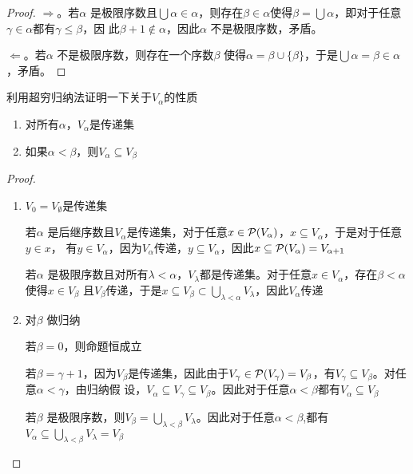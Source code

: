 \documentclass[11pt]{article}
\begin{document}
\begin{proof}
\(\Rightarrow\)。若\(\alpha\) 是极限序数且\(\bigcup\alpha\in\alpha\)，则存在\(\beta\in\alpha\)使得\(\beta=\bigcup\alpha\)，即对于任意\(\gamma\in\alpha\)都有\(\gamma\le\beta\)，因
此\(\beta+1\notin\alpha\)，因此\(\alpha\) 不是极限序数，矛盾。

\(\Leftarrow\)。若\(\alpha\) 不是极限序数，则存在一个序数\(\beta\) 使得\(\alpha=\beta\cup\{\beta\}\)，于是\(\bigcup\alpha=\beta\in\alpha\)，矛盾。
\end{proof}

\begin{exercise}[1.3.43]
利用超穷归纳法证明一下关于\(V_\alpha\)的性质
\begin{enumerate}
\item 对所有\(\alpha\)，\(V_\alpha\)是传递集
\item 如果\(\alpha<\beta\)，则\(V_\alpha\subseteq V_\beta\)
\end{enumerate}
\end{exercise}

\begin{proof}
\begin{enumerate}
\item \(V_0=V_\emptyset\)是传递集

若\(\alpha\) 是后继序数且\(V_\alpha\)是传递集，对于任意\(x\in\mathcal{P}(V_\alpha)\)，\(x\subseteq V_\alpha\)，于是对于任意\(y\in x\)，
有\(y\in V_\alpha\)，因为\(V_\alpha\)传递，\(y\subseteq V_\alpha\)，因此\(x\subseteq\mathcal{P}(V_\alpha)=V_{\alpha+1}\)

若\(\alpha\) 是极限序数且对所有\(\lambda<\alpha\)，\(V_\lambda\)都是传递集。对于任意\(x\in V_\alpha\)，存在\(\beta<\alpha\)使得\(x\in V_\beta\)
且\(V_\beta\)传递，于是\(x\subseteq V_\beta\subset\bigcup_{\lambda<\alpha}V_\lambda\)，因此\(V_\alpha\)传递

\item 对\(\beta\) 做归纳

若\(\beta=0\)，则命题恒成立

若\(\beta=\gamma+1\)，因为\(V_\beta\)是传递集，因此由于\(V_\gamma\in \mathcal{P}(V_\gamma)=V_\beta\)，有\(V_\gamma\subseteq V_\beta\)。对任意\(\alpha<\gamma\)，由归纳假
设，\(V_\alpha\subseteq V_\gamma\subseteq V_\beta\)。因此对于任意\(\alpha<\beta\)都有\(V_\alpha\subseteq V_\beta\)

若\(\beta\) 是极限序数，则\(V_\beta=\bigcup_{\lambda<\beta}V_\lambda\)。因此对于任意\(\alpha<\beta\),都有\(V_\alpha\subseteq \bigcup_{\lambda<\beta}V_\lambda=V_\beta\)
\end{enumerate}
\end{proof}
\end{document}
